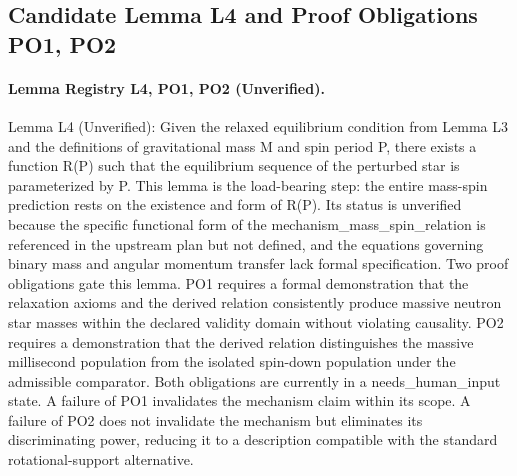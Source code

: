 \documentclass[conference]{IEEEtran}
\begin{document}
\subsection{Candidate Lemma L4 and Proof Obligations PO1, PO2}
\paragraph{Lemma Registry L4, PO1, PO2 (Unverified).} Lemma L4 (Unverified): Given the relaxed equilibrium condition from Lemma L3 and the definitions of gravitational mass M and spin period P, there exists a function R(P) such that the equilibrium sequence of the perturbed star is parameterized by P. This lemma is the load-bearing step: the entire mass-spin prediction rests on the existence and form of R(P). Its status is unverified because the specific functional form of the mechanism\_mass\_spin\_relation is referenced in the upstream plan but not defined, and the equations governing binary mass and angular momentum transfer lack formal specification. Two proof obligations gate this lemma. PO1 requires a formal demonstration that the relaxation axioms and the derived relation consistently produce massive neutron star masses within the declared validity domain without violating causality. PO2 requires a demonstration that the derived relation distinguishes the massive millisecond population from the isolated spin-down population under the admissible comparator. Both obligations are currently in a needs\_human\_input state. A failure of PO1 invalidates the mechanism claim within its scope. A failure of PO2 does not invalidate the mechanism but eliminates its discriminating power, reducing it to a description compatible with the standard rotational-support alternative.
\end{document}

